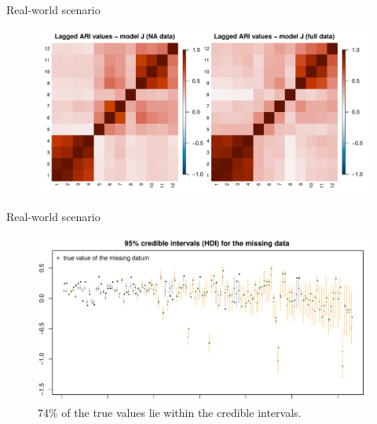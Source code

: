 \documentclass[
	11pt, %
 xcolor={dvipsnames,svgnames}
]{beamer}
\begin{document}
\begin{frame}{Real-world scenario}

    \begin{figure}[!ht]
    \centering
    \includegraphics[width=1\linewidth]{Testing/NA data/space/ari.pdf}
    \label{fig: ari space na}
\end{figure}
\end{frame}

\begin{frame}{Real-world scenario}

    \begin{figure}
        \centering
        \includegraphics[width=1\linewidth]{imgs/NA_SORTED_space_pure.pdf}
        \caption{74\% of the true values lie within the credible intervals.}
        \label{fig:enter-label}
    \end{figure}
\end{frame}
\end{document}
